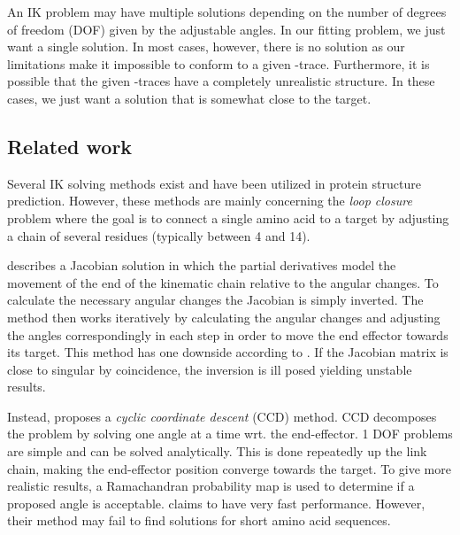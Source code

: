 An IK problem may have multiple solutions depending on the number of degrees of freedom (DOF) given by the adjustable angles.
In our fitting problem, we just want a single solution.
In most cases, however, there is no solution as our limitations make it impossible to conform to a given \Ca-trace.
Furthermore, it is possible that the given \Ca-traces have a completely unrealistic structure.
In these cases, we just want a solution that is somewhat close to the target.


\subsection{Related work}
Several IK solving methods exist and have been utilized in protein structure prediction.
However, these methods are mainly concerning the \emph{loop closure} problem \cite{coutsias2004kinematic} where the goal is to connect a single amino acid to a target by adjusting a chain of several residues (typically between 4 and 14).
  
\cite{shenkin1987} describes a Jacobian solution in which the partial derivatives model the movement of the end of the kinematic chain relative to the angular changes.
To calculate the necessary angular changes the Jacobian is simply inverted.
The method then works iteratively by calculating the angular changes and adjusting the angles correspondingly in each step in order to move the end effector towards its target.
This method has one downside according to \cite{canutescu2003}.
If the Jacobian matrix is close to singular by coincidence, the inversion is ill posed yielding unstable results.

Instead, \cite{canutescu2003} proposes a \emph{cyclic coordinate descent} (CCD) method.
CCD decomposes the problem by solving one angle at a time wrt. the end-effector.
1 DOF problems are simple and can be solved analytically.
This is done repeatedly up the link chain, making the end-effector position converge towards the target.
To give more realistic results, a Ramachandran probability map is used to determine if a proposed angle is acceptable. 
\cite{canutescu2003} claims to have very fast performance. 
However, their method may fail to find solutions for short amino acid sequences.

